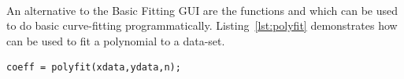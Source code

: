 \addtolength{\parindent}{-4mm}
\\
\addtolength{\parindent}{4mm}

An alternative to the Basic Fitting GUI are the functions  and  which can be used to do basic curve-fitting programmatically. Listing~\ref{lst:polyfit} demonstrates how  can be used to fit a polynomial to a data-set.
\begin{lstlisting}[caption={Syntax of \mcode{polyfit} command},label=lst:polyfit]
coeff = polyfit(xdata,ydata,n);
\end{lstlisting}

